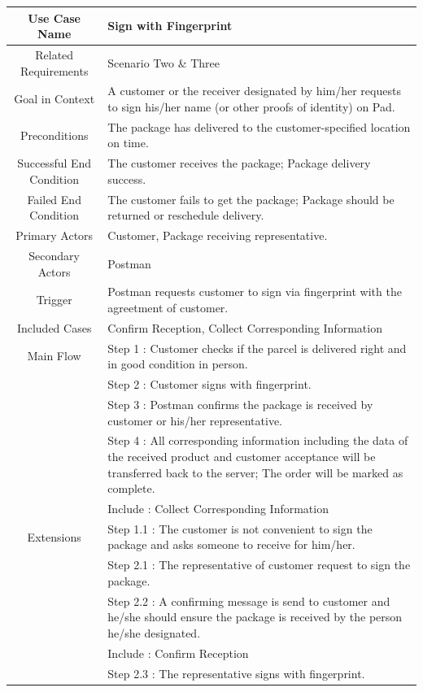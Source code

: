 \documentclass[12pt]{scrreprt}
\begin{document}
\begin{table}
  \centering
  \begin{tabular}{| c | p{11cm} |}
    \hline
    Use Case Name & Sign with Fingerprint\\
    \hline
    Related Requirements & Scenario Two \& Three\\
    \hline
    Goal in Context & A customer or the receiver designated by him/her requests
    to sign his/her name (or other proofs of identity) on Pad.\\
    \hline
    Preconditions & The package has delivered to the customer-specified location
     on time.\\
    \hline
    Successful End Condition & The customer receives the package; Package
    delivery success.\\
    \hline
    Failed End Condition & The customer fails to get the package; Package
    should be returned or reschedule delivery.\\
    \hline
    Primary Actors & Customer, Package receiving representative.\\
    \hline
    Secondary Actors & Postman\\
    \hline
    Trigger & Postman requests customer to sign via fingerprint with the
    agreetment of customer.\\
    \hline
    Included Cases & Confirm Reception, Collect Corresponding Information\\
    \hline
    Main Flow & Step 1 : Customer checks if the parcel is delivered right and
    in good condition in person.\\
    & Step 2 : Customer signs with fingerprint.\\
    & Step 3 : Postman confirms the package is received by customer or his/her
     representative.\\
    & Step 4 : All corresponding information including the data of the received
    product and customer acceptance will be transferred back to the server; The
    order will be marked as complete.\\
    & Include : Collect Corresponding Information\\
    \hline
    Extensions & Step 1.1 : The customer is not convenient to sign the package
    and asks someone to receive for him/her.\\
    & Step 2.1 : The representative of customer request to sign the package.\\
    & Step 2.2 : A confirming message is send to customer and he/she should
    ensure the package is received by the person he/she designated.\\
    & Include : Confirm Reception\\
    & Step 2.3 : The representative signs with fingerprint.\\
    \hline
  \end{tabular}
\end{table}
\end{document}
